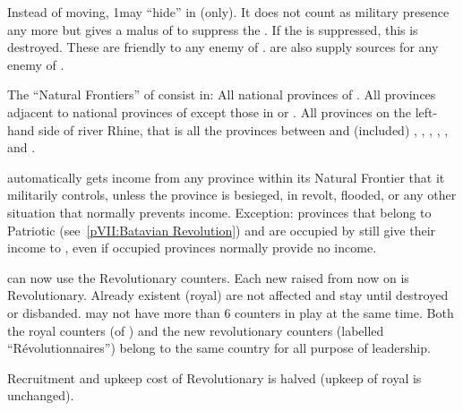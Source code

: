 \begin{digressions}
  \phmil
  \aparag Instead of moving, 1\LD may ``hide'' in \provinceVendee (only). It
  does not count as military presence any more but gives a malus of 
  to suppress the \REBELLION .
  \bparag If the \REBELLION is suppressed, this \LD is destroyed.
  \aparag These \REBELLION are friendly to any enemy of
  \FRA. \REBELLION\Faceplus are also supply sources for any enemy of \FRA.



  \condition{}
  \aparag The ``Natural Frontiers'' of \FRA consist in:
  \bparag All national provinces of \FRA.
  \bparag All provinces adjacent to national provinces of \FRA except those in
  \HIS or \paysSuisse.
  \bparag All provinces on the left-hand side of river Rhine, that is all the
  provinces between \FRA and (included) \provinceAlsace, \provincePfalz,
  \provinceTrier, \provinceKoln, \provinceLimburg, \provinceUtrecht and
  \provinceZeeland.

  \phadm
  \aparag \FRA automatically gets income from any province within its Natural
  Frontier that it militarily controls, unless the province is besieged, in
  revolt, flooded, or any other situation that normally prevents income.
  \bparag Exception: provinces that belong to Patriotic \HOL
  (see~\ref{pVII:Batavian Revolution}) and are occupied by \FRA still give
  their income to \HOL, even if occupied provinces normally provide no
  income.



  \phadm
  \aparag \FRA can now use the Revolutionary \ARMY counters.
  \bparag Each new \ARMY raised from now on is Revolutionary.
  \bparag Already existent (royal) \ARMY are not affected and stay until
  destroyed or disbanded.
  \bparag \FRA may not have more than 6 \ARMY counters in play at the same
  time.
  \bparag Both the royal counters (of \FRA) and the new revolutionary counters
  (labelled ``Révolutionnaires'') belong to the same country for all purpose
  of leadership.

  \aparag Recruitment and upkeep cost of Revolutionary \ARMY is halved (upkeep
  of royal \ARMY is unchanged).


\end{digressions}
